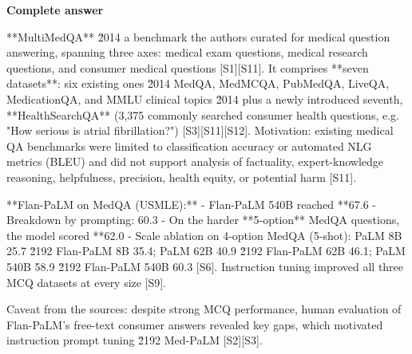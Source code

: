 \documentclass[10pt]{article}
\begin{document}
\textbf{Complete answer}
\begin{AnswerText}
**MultiMedQA** \u2014 a benchmark the authors curated for medical question answering, spanning three axes: medical exam questions, medical research questions, and consumer medical questions [S1][S11]. It comprises **seven datasets**: six existing ones \u2014 MedQA, MedMCQA, PubMedQA, LiveQA, MedicationQA, and MMLU clinical topics \u2014 plus a newly introduced seventh, **HealthSearchQA** (3,375 commonly searched consumer health questions, e.g. "How serious is atrial fibrillation?") [S3][S11][S12]. Motivation: existing medical QA benchmarks were limited to classification accuracy or automated NLG metrics (BLEU) and did not support analysis of factuality, expert-knowledge reasoning, helpfulness, precision, health equity, or potential harm [S11].

**Flan-PaLM on MedQA (USMLE):**
- Flan-PaLM 540B reached **67.6%
- Breakdown by prompting: 60.3%
- On the harder **5-option** MedQA questions, the model scored **62.0%
- Scale ablation on 4-option MedQA (5-shot): PaLM 8B 25.7 \u2192 Flan-PaLM 8B 35.4; PaLM 62B 40.9 \u2192 Flan-PaLM 62B 46.1; PaLM 540B 58.9 \u2192 Flan-PaLM 540B 60.3 [S6]. Instruction tuning improved all three MCQ datasets at every size [S9].

Caveat from the sources: despite strong MCQ performance, human evaluation of Flan-PaLM's free-text consumer answers revealed key gaps, which motivated instruction prompt tuning \u2192 Med-PaLM [S2][S3].
\end{AnswerText}
\end{document}
